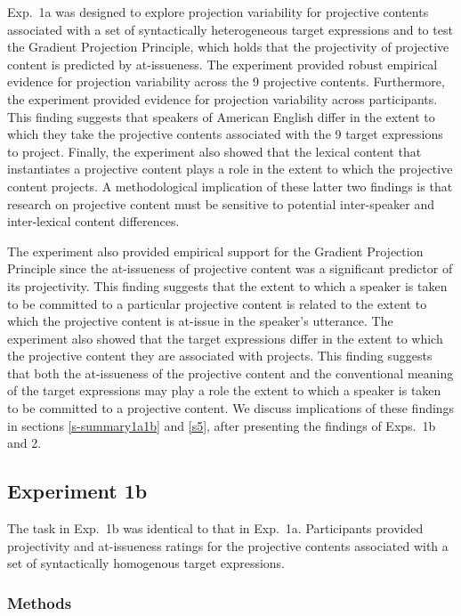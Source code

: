 \documentclass[11pt,fleqn]{article}
\newcommand{\6}{\mbox{$[\hspace*{-.6mm}[$}}
\newcommand{\9}{\mbox{$]\hspace*{-.6mm}]$}}
\begin{document}
Exp.~1a was designed to explore projection variability for projective contents associated with a set of syntactically heterogeneous target expressions and to test the Gradient Projection Principle, which holds that the projectivity of projective content is predicted by at-issueness. The experiment provided robust empirical evidence for projection variability across the 9 projective contents. Furthermore, the experiment provided evidence for projection variability across participants. This finding suggests that speakers of American English differ in the extent to which they take the projective contents associated with the 9 target expressions to project. Finally, the experiment also showed that the lexical content that instantiates a projective content plays a role in the extent to which the projective content projects. A methodological implication of these latter two findings is that research on projective content must be sensitive to potential inter-speaker and inter-lexical content differences.

The experiment also provided empirical support for the Gradient Projection Principle since the at-issueness of projective content was a significant predictor of its projectivity. This finding suggests that the extent to which a speaker is taken to be committed to a particular projective content is related to the extent to which the projective content is at-issue in the speaker's utterance. The experiment also showed that the target expressions differ in the extent to which the projective content they are associated with projects. This finding suggests that both the at-issueness of the projective content and the conventional meaning of the target expressions may play a role the extent to which a speaker is taken to be committed to a projective content. We discuss implications of these findings in sections \ref{s-summary1a1b} and \ref{s5}, after presenting the findings of Exps.~1b and 2.

\subsection{Experiment 1b}\label{s-exp1b} 

The task in Exp.~1b was identical to that in Exp.~1a. Participants provided projectivity and at-issueness ratings for the projective contents associated with a set of syntactically homogenous target expressions.  

\subsubsection{Methods}
\end{document}
